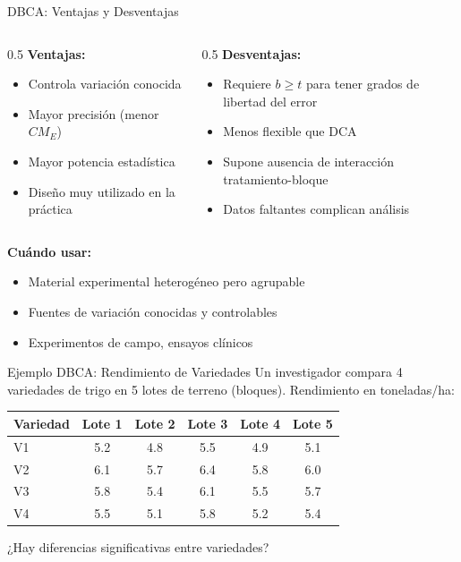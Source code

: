 \documentclass[aspectratio=169]{beamer}
\begin{document}
\begin{frame}{DBCA: Ventajas y Desventajas}
\begin{columns}
\begin{column}{0.5\textwidth}
\textbf{Ventajas:}
\begin{itemize}
\item Controla variación conocida
\item Mayor precisión (menor $CM_E$)
\item Mayor potencia estadística
\item Diseño muy utilizado en la práctica
\end{itemize}
\end{column}
\begin{column}{0.5\textwidth}
\textbf{Desventajas:}
\begin{itemize}
\item Requiere $b \geq t$ para tener grados de libertad del error
\item Menos flexible que DCA
\item Supone ausencia de interacción tratamiento-bloque
\item Datos faltantes complican análisis
\end{itemize}
\end{column}
\end{columns}

\vspace{0.4cm}
\textbf{Cuándo usar:}
\begin{itemize}
\item Material experimental heterogéneo pero agrupable
\item Fuentes de variación conocidas y controlables
\item Experimentos de campo, ensayos clínicos
\end{itemize}
\end{frame}

\begin{frame}{Ejemplo DBCA: Rendimiento de Variedades}
Un investigador compara 4 variedades de trigo en 5 lotes de terreno (bloques). Rendimiento en toneladas/ha:

\vspace{0.2cm}
\small
\begin{table}
\centering
\begin{tabular}{lccccc}
\toprule
\textbf{Variedad} & \textbf{Lote 1} & \textbf{Lote 2} & \textbf{Lote 3} & \textbf{Lote 4} & \textbf{Lote 5} \\
\midrule
V1 & 5.2 & 4.8 & 5.5 & 4.9 & 5.1 \\
V2 & 6.1 & 5.7 & 6.4 & 5.8 & 6.0 \\
V3 & 5.8 & 5.4 & 6.1 & 5.5 & 5.7 \\
V4 & 5.5 & 5.1 & 5.8 & 5.2 & 5.4 \\
\bottomrule
\end{tabular}
\end{table}

\vspace{0.3cm}
\normalsize
¿Hay diferencias significativas entre variedades?
\end{frame}
\end{document}
